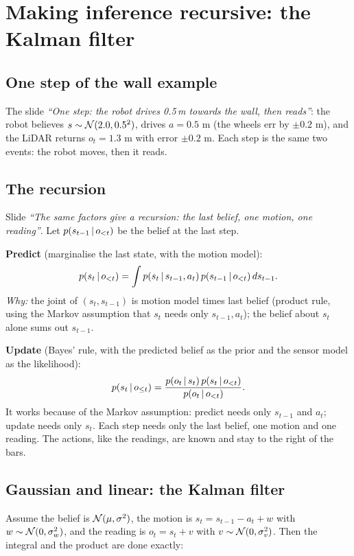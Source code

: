 \documentclass[11pt]{article}
\newcommand{\slide}[1]{\textit{``#1''}}
\begin{document}
\section{Making inference recursive: the Kalman filter}

\subsection*{One step of the wall example}
The slide \slide{One step: the robot drives 0.5\,m towards the wall, then reads}: the robot believes $s\sim\mathcal{N}(2.0,0.5^2)$, drives $a=0.5$ m (the wheels err by $\pm0.2$ m), and the LiDAR returns $o_t=1.3$ m with error $\pm0.2$ m.
Each step is the same two events: the robot moves, then it reads.

\subsection*{The recursion}
Slide \slide{The same factors give a recursion: the last belief, one motion, one reading}. Let $p(s_{t-1}\,|\, o_{<t})$ be the belief at the last step.

\textbf{Predict} (marginalise the last state, with the motion model):
\[
p(s_t\,|\, o_{<t})=\int p(s_t\,|\, s_{t-1},a_t)\,p(s_{t-1}\,|\, o_{<t})\,ds_{t-1}.
\]
\emph{Why:} the joint of $(s_t,s_{t-1})$ is motion model times last belief (product rule, using the Markov assumption that $s_t$ needs only $s_{t-1},a_t$); the belief about $s_t$ alone sums out $s_{t-1}$.

\textbf{Update} (Bayes' rule, with the predicted belief as the prior and the sensor model as the likelihood):
\[
p(s_t\,|\, o_{\le t})=\frac{p(o_t\,|\, s_t)\,p(s_t\,|\, o_{<t})}{p(o_t\,|\, o_{<t})}.
\]
It works because of the Markov assumption: predict needs only $s_{t-1}$ and $a_t$; update needs only $s_t$. Each step needs only the last belief, one motion and one reading. The actions, like the readings, are known and stay to the right of the bars.

\subsection*{Gaussian and linear: the Kalman filter}
Assume the belief is $\mathcal{N}(\mu,\sigma^2)$, the motion is $s_t=s_{t-1}-a_t+w$ with $w\sim\mathcal{N}(0,\sigma_w^2)$, and the reading is $o_t=s_t+v$ with $v\sim\mathcal{N}(0,\sigma_v^2)$. Then the integral and the product are done exactly:
\end{document}
